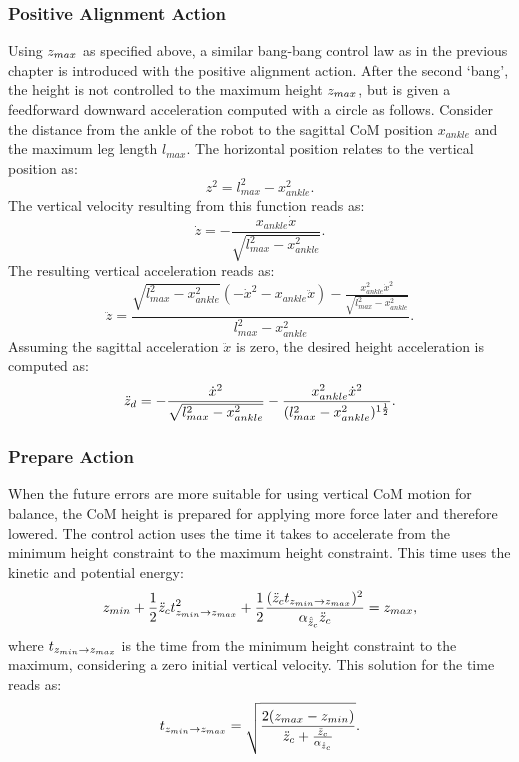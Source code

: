 \subsubsection{Positive Alignment Action} 
Using $z_{max}$ as specified above, a similar bang-bang control law as in the previous chapter is introduced with the positive alignment action. After the second `bang', the height is not controlled to the maximum height $z_{max}$, but is given a feedforward downward acceleration computed with a circle as follows. Consider the distance from the ankle of the robot to the sagittal \ac{CoM} position $x_{ankle}$ and the maximum leg length $l_{max}$. The horizontal position relates to the vertical position as:
\begin{equation}
z^2 = l_{max}^2-x_{ankle}^2.
\end{equation}
The vertical velocity resulting from this function reads as:
\begin{equation}
 \dot{z} = -\frac{x_{ankle}\dot{x}}{\sqrt{l_{max}^2-x_{ankle}^2}}.
\end{equation}
The resulting vertical acceleration reads as:
\begin{equation}
\ddot{z} = \frac{\sqrt{l_{max}^2-x_{ankle}^2}(-\dot{x}^2-x_{ankle}\ddot{x}) - \frac{x_{ankle}^2\dot{x}^2}{\sqrt{l_{max}^2-x_{ankle}^2}}}{ l_{max}^2-x_{ankle}^2}.
\end{equation}
Assuming the sagittal acceleration $\ddot{x}$ is zero, the desired height acceleration is computed as:
\begin{equation}
 \ddot{z}_d = -\frac{\dot{x}^2}{\sqrt{ l_{max}^2-x_{ankle}^2}} - \frac{x_{ankle}^2\dot{x}^2}{(l_{max}^2-x_{ankle}^2)^{1\frac{1}{2}}}.
\end{equation}
\subsubsection{Prepare Action} 
When the future errors are more suitable for using vertical \ac{CoM} motion for balance, the \ac{CoM} height is prepared for applying more force later and therefore lowered. The control action uses the time it takes to accelerate from the minimum height constraint to the maximum height constraint. This time uses the kinetic and potential energy:
\begin{equation}
	z_{min} + \frac{1}{2}\ddot{z}_{c} t_{z_{min} \rightarrow z_{max}}^2 + \frac{1}{2}\frac{(\ddot{z}_{c} t_{z_{min} \rightarrow z_{max}})^2}{\alpha_{\hat{\ddot{z}}_{c}} \ddot{z}_{c}} = z_{max},
\end{equation}
where $t_{z_{min} \rightarrow z_{max}}$ is the time from the minimum height constraint to the maximum, considering a zero initial vertical velocity.
This solution for the time reads as:
\begin{equation}
 t_{z_{min} \rightarrow z_{max}}= \sqrt{\frac{2(z_{max} - z_{min})}{\ddot{z}_{c} + \frac{\ddot{z}_{c}}{\alpha_{\hat{\ddot{z}}_{c}}} }}.
\end{equation}

